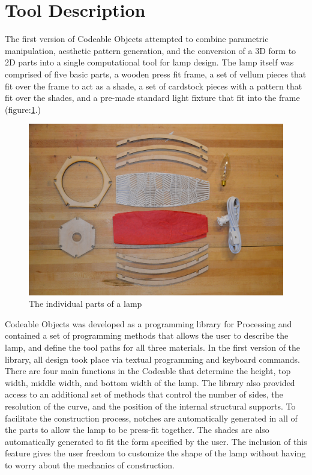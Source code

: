 \section{Tool Description}
The first version of Codeable Objects attempted to combine parametric manipulation, aesthetic pattern generation, and the conversion of a 3D form to 2D parts into a single computational tool for lamp design. The lamp itself was comprised of five basic parts, a wooden press fit frame, a set of vellum pieces that fit over the frame to act as a shade, a set of cardstock pieces with a pattern that fit over the shades, and a pre-made standard light fixture that fit into the frame (figure:\ref{fig:lamp_parts}.)
\begin{center}
\begin{figure}[h!]
\includegraphics[width=\columnwidth]{images/parts.png}
\caption{The individual parts of a lamp}
\label{fig:lamp_parts}
\end{figure}
\end{center}
\vspace{-20pt}

Codeable Objects was developed as a programming library for Processing and contained a set of programming methods that allows the user to describe the lamp, and define the tool paths for all three materials. In the first version of the library, all design took place via textual programming and keyboard commands. There are four main functions in the Codeable that determine the height, top width, middle width, and bottom width of the lamp. The library also provided access to an additional set of methods that control the number of sides, the resolution of the curve, and the position of the internal structural supports. To facilitate the construction process, notches are automatically generated in all of the parts to allow the lamp to be press-fit together. The shades are also automatically generated to fit the form specified by the user. The inclusion of this feature gives the user freedom to customize the shape of the lamp without having to worry about the mechanics of construction.


